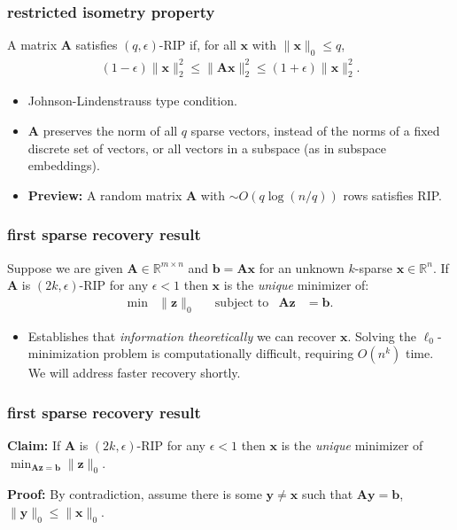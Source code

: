 \documentclass[compress]{beamer}
\newcommand{\bv}[1]{\mathbf{#1}}
\newcommand{\R}{\mathbb{R}}
\begin{document}
\begin{frame}
	\frametitle{restricted isometry property}
	\begin{definition}
		A matrix $\bv{A}$ satisfies $(q,\epsilon)$-RIP if, for all $\bv{x}$ with $\|\bv{x}\|_0 \leq q$, 
		\begin{align*}
			(1-\epsilon)\|\bv{x}\|_2^2 \leq \|\bv{A}\bv{x}\|_2^2 \leq  (1+\epsilon)\|\bv{x}\|_2^2.
		\end{align*}
	\end{definition}
	\begin{itemize}
		\item Johnson-Lindenstrauss type condition.
		\item $\bv{A}$ preserves the norm of all $q$ sparse vectors, instead of the norms of a fixed discrete set of vectors, or all vectors in a subspace (as in subspace embeddings).
		\item \textbf{Preview:} A random matrix $\bv{A}$ with $\sim O(q\log(n/q))$ rows satisfies RIP.
	\end{itemize}
\end{frame}

\begin{frame}[t]
	\frametitle{first sparse recovery result}
	\begin{theorem}
		Suppose we are given $\bv{A} \in \R^{m\times n}$ and $\bv{b} = \bv{A}\bv{x}$ for an unknown $k$-sparse $\bv{x} \in \R^n$.
		If $\bv{A}$ is $(2k,\epsilon)$-RIP for any $\epsilon < 1$ then $\bv{x}$ is the \emph{unique} minimizer of:
		\begin{align*}
			\min &\|\bv{z}\|_0 & &\text{subject to} & \bv{A}\bv{z} &= \bv{b} .
		\end{align*}
	\end{theorem}
	\begin{itemize}
		\item Establishes that \emph{information theoretically} we can recover $\bv{x}$. Solving the $\ell_0$-minimization problem is computationally difficult, requiring $O(n^k)$ time. We will address faster recovery shortly.
	\end{itemize}
\end{frame}

\begin{frame}[t]
	\frametitle{first sparse recovery result}
	\textbf{Claim:} If $\bv{A}$ is $(2k,\epsilon)$-RIP for any $\epsilon < 1$ then $\bv{x}$ is the \emph{unique} minimizer of $\min_{\bv{A}\bv{z} = \bv{b}}\|\bv{z}\|_0$.
	
	\textbf{Proof:} By contradiction, assume there is some $\bv{y} \neq \bv{x}$ such that $\bv{Ay=b}$, $\|\bv{y}\|_0 \leq \|\bv{x}\|_0$. 
	
\end{frame}
\end{document}
